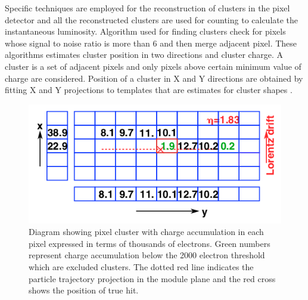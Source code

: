 Specific techniques are employed for the reconstruction of clusters in the pixel detector and all the reconstructed clusters are used for counting to calculate the instantaneous luminosity. Algorithm used for finding clusters check for pixels whose signal to noise ratio is more than 6 and then merge adjacent pixel. These algorithms estimates cluster position in two directions and cluster charge. A cluster is a set of adjacent pixels and only pixels above certain minimum value of charge are considered. Position of a cluster in X and Y directions are obtained by fitting X and Y projections to templates that are estimates for cluster shapes \cite{Chatrchyan:2014fea}. \\


\begin{figure}[H]
  \centering
  \includegraphics[width=0.6\columnwidth]{./pixel_reco.png}
  \caption{ \onehalfspacing Diagram showing pixel cluster with charge accumulation in each pixel expressed in terms of thousands of electrons. Green numbers represent charge accumulation below the 2000 electron threshold which are excluded clusters. The dotted red line indicates the particle trajectory projection in the module plane and the red cross shows the position of true hit.}
  \label{fig:CMS}
\end{figure}








